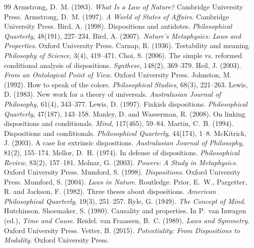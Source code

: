 \documentclass{situationist-preprint}
\begin{document}
\begin{thebibliography}{99}\small
{} Armstrong, D.~M. (1983). \emph{What Is a Law of Nature?} Cambridge University Press.
 Armstrong, D.~M. (1997). \emph{A World of States of Affairs}. Cambridge University Press.
 Bird, A. (1998). Dispositions and antidotes. \emph{Philosophical Quarterly}, 48(191), 227--234.
 Bird, A. (2007). \emph{Nature's Metaphysics: Laws and Properties}. Oxford University Press.
 Carnap, R. (1936). Testability and meaning. \emph{Philosophy of Science}, 3(4), 419--471.
 Choi, S. (2006). The simple vs. reformed conditional analysis of dispositions. \emph{Synthese}, 148(2), 369--379.
 Heil, J. (2003). \emph{From an Ontological Point of View}. Oxford University Press.
 Johnston, M. (1992). How to speak of the colors. \emph{Philosophical Studies}, 68(3), 221--263.
 Lewis, D. (1983). New work for a theory of universals. \emph{Australasian Journal of Philosophy}, 61(4), 343--377.
 Lewis, D. (1997). Finkish dispositions. \emph{Philosophical Quarterly}, 47(187), 143--158.
 Manley, D. and Wasserman, R. (2008). On linking dispositions and conditionals. \emph{Mind}, 117(465), 59--84.
 Martin, C.~B. (1994). Dispositions and conditionals. \emph{Philosophical Quarterly}, 44(174), 1--8.
 McKitrick, J. (2003). A case for extrinsic dispositions. \emph{Australasian Journal of Philosophy}, 81(2), 155--174.
 Mellor, D.~H. (1974). In defense of dispositions. \emph{Philosophical Review}, 83(2), 157--181.
 Molnar, G. (2003). \emph{Powers: A Study in Metaphysics}. Oxford University Press.
 Mumford, S. (1998). \emph{Dispositions}. Oxford University Press.
 Mumford, S. (2004). \emph{Laws in Nature}. Routledge.
 Prior, E.~W., Pargetter, R. and Jackson, F. (1982). Three theses about dispositions. \emph{American Philosophical Quarterly}, 19(3), 251--257.
 Ryle, G. (1949). \emph{The Concept of Mind}. Hutchinson.
 Shoemaker, S. (1980). Causality and properties. In P.~van Inwagen (ed.), \emph{Time and Cause}. Reidel.
 van Fraassen, B.~C. (1989). \emph{Laws and Symmetry}. Oxford University Press.
 Vetter, B. (2015). \emph{Potentiality: From Dispositions to Modality}. Oxford University Press.
\end{thebibliography}
\end{document}
